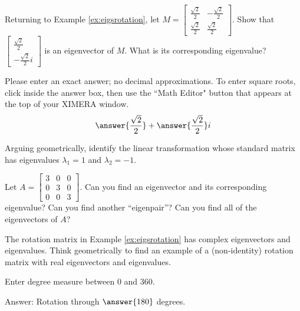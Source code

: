 \documentclass{ximera}
\begin{document}
    
\begin{problem}\label{ex:eigsrotation2}
Returning to Example \ref{ex:eigsrotation}, let $M=\begin{bmatrix}
\frac{\sqrt{2}}{2} & -\frac{\sqrt{2}}{2}\\
\frac{\sqrt{2}}{2} & \frac{\sqrt{2}}{2}
\end{bmatrix}$.  Show that $\begin{bmatrix} \frac{\sqrt{2}}{2}\\ -\frac{\sqrt{2}}{2} i \end{bmatrix}$ is an eigenvector of $M$.  What is its corresponding eigenvalue?
    
Please enter an exact answer; no decimal approximations.  To enter square roots, click inside the answer box, then use the ``Math Editor" button that appears at the top of your XIMERA window.
$$\answer{\frac{\sqrt{2}}{2}}+\answer{\frac{\sqrt{2}}{2}}i$$
\end{problem}
    
    
\begin{problem}\label{prob:eigenvalgeometry}
Arguing geometrically, identify the linear transformation whose standard matrix has eigenvalues $\lambda_1=1$ and $\lambda_2=-1$.
\begin{multipleChoice}
    \end{multipleChoice}
\end{problem}
    
\begin{problem}\label{prob:eigvalvectorsofdiagmat} Let $A=\begin{bmatrix} 3&0&0\\0&3&0\\0&0&3\end{bmatrix}$.  Can you find an eigenvector and its corresponding eigenvalue?  Can you find another ``eigenpair''?  Can you find all of the eigenvectors of $A$?
\end{problem}
    
\begin{problem}\label{prob:rotmatrixrealeig1}The rotation matrix in Example \ref{ex:eigsrotation} has complex eigenvectors and eigenvalues.  Think geometrically to find an example of a (non-identity) rotation matrix with real eigenvectors and eigenvalues. 
    
Enter degree measure between 0 and 360.
    
Answer:  Rotation through $\answer{180}$ degrees.
\end{problem}
    
\end{document}
